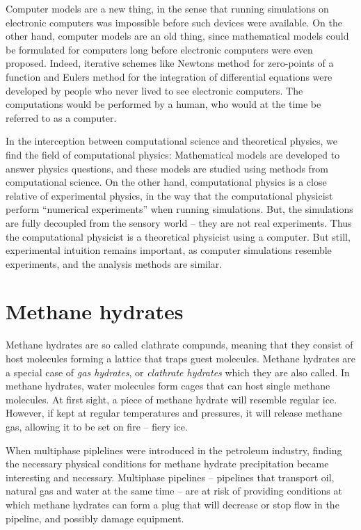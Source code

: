 Computer models are a new thing, in the sense that running simulations on electronic computers was impossible before such devices were available. On the other hand, computer models are an old thing, since mathematical models could be formulated for computers long before electronic computers were even proposed. Indeed, iterative schemes like Newtons method for zero-points of a function and Eulers method for the integration of differential equations were developed by people who never lived to see electronic computers. The computations would be performed by a human, who would at the time be referred to as a computer. 

In the interception between computational science and theoretical physics, we find the field of computational physics: Mathematical models are developed to answer physics questions, and these models are studied using methods from computational science. On the other hand, computational physics is a close relative of experimental physics, in the way that the computational physicist perform ``numerical experiments'' when running simulations. But, the simulations are fully decoupled from the sensory world -- they are not real experiments. Thus the computational physicist is a theoretical physicist using a computer. But still, experimental intuition remains important, as computer simulations resemble experiments, and the analysis methods are similar.

\section{Methane hydrates}
Methane hydrates are so called clathrate compunds, meaning that they consist of host molecules forming a lattice that traps guest molecules. Methane hydrates are a special case of \emph{gas hydrates}, or \emph{clathrate hydrates} which they are also called. In methane hydrates, water molecules form cages that can host single methane molecules. At first sight, a piece of methane hydrate will resemble regular ice. However, if kept at regular temperatures and pressures, it will release methane gas, allowing it to be set on fire -- fiery ice. 

When multiphase piplelines were introduced in the petroleum industry, finding the necessary physical conditions for methane hydrate precipitation became interesting and necessary. Multiphase pipelines -- pipelines that transport oil, natural gas and water at the same time -- are at risk of providing conditions at which methane hydrates can form a plug that will decrease or stop flow in the pipeline, and possibly damage equipment.

